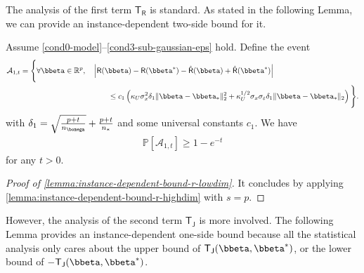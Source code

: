 \documentclass[10pt]{article}
\numberwithin{equation}{section}
\begin{document}
The analysis of the first term $\mathsf{T}_{\mathsf{R}}$ is standard. As stated in the following Lemma, we can provide an instance-dependent two-side bound for it.
\begin{lemma}
\label{lemma:instance-dependent-bound-r-lowdim}
Assume \cref{cond0-model}--\ref{cond3-sub-gaussian-eps} hold. Define the event
\begin{align}
\begin{split}
    \mathcal{A}_{1,t} = \Bigg\{ \forall \bbeta \in \mathbb{R}^p, ~~ &~ \left|\mathsf{R}(\bbeta) - \mathsf{R}(\bbeta^*) - \hat{\mathsf{R}}(\bbeta) + \hat{\mathsf{R}}(\bbeta^*)\right| \\
    & ~~~~~~~ \le c_1 \left(\kappa_U \sigma_x^2 \delta_1 \|\bbeta - \bbeta_*\|_2^2 + \kappa_U^{1/2} \sigma_x \sigma_\varepsilon \delta_1 \|\bbeta - \bbeta_*\|_2 \right)\Bigg\}.
\end{split} 
\end{align} with $\delta_1 = \sqrt{\frac{p + t}{n_{\bomega}}} + \frac{p + t}{n_*}$ and some universal constants $c_1$. We have 
\begin{align*}
\mathbb{P}[\mathcal{A}_{1,t}] \ge 1-e^{-t}
\end{align*} for any $t>0$.
\end{lemma}
\begin{proof}[Proof of \cref{lemma:instance-dependent-bound-r-lowdim}]
    It concludes by applying \cref{lemma:instance-dependent-bound-r-highdim} with $s=p$.
\end{proof}

However, the analysis of the second term $\mathsf{T}_{\mathsf{J}}$ is more involved. The following Lemma provides an instance-dependent one-side bound because all the statistical analysis only cares about the upper bound of $\mathsf{T}_{\mathsf{J}}(\bbeta,\bbeta^*)$, or the lower bound of $-\mathsf{T}_{\mathsf{J}}(\bbeta,\bbeta^*)$.
\end{document}
